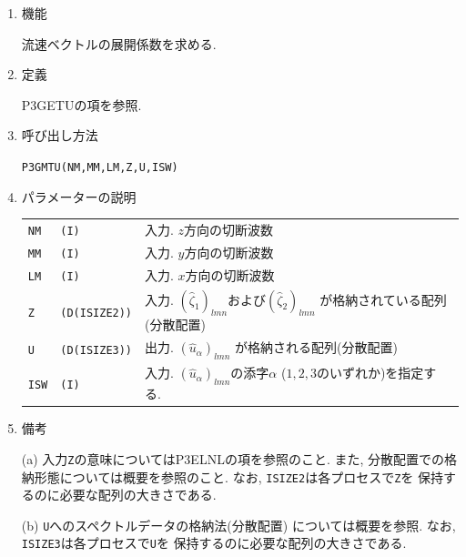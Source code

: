 \documentclass[a4j,fleqn]{jarticle}
\begin{document}
\begin{enumerate}

\item 機能

流速ベクトルの展開係数を求める.

\item 定義

P3GETUの項を参照.

\item 呼び出し方法

{\tt P3GMTU(NM,MM,LM,Z,U,ISW)}
  
\item パラメーターの説明

\begin{tabular}{lll}
{\tt NM} & {\tt (I)} & 入力. $z$方向の切断波数\\
{\tt MM} & {\tt (I)} & 入力. $y$方向の切断波数\\
{\tt LM} & {\tt (I)} & 入力. $x$方向の切断波数\\
{\tt Z} & {\tt (D(ISIZE2))} &
 入力. $(\hat{\zeta}_1)_{lmn}$および$(\hat{\zeta}_2)_{lmn}$
  が格納されている配列(分散配置)\\
{\tt U} & {\tt (D(ISIZE3))} &
 出力. $(\hat{u}_{\alpha})_{lmn}$
  が格納される配列(分散配置)\\
{\tt ISW} & {\tt (I)} & 入力. $(\hat{u}_{\alpha})_{lmn}$の添字$\alpha$
($1,2,3$のいずれか)を指定する.
\end{tabular}

\item 備考

(a) 入力{\tt Z}の意味についてはP3ELNLの項を参照のこと.
    また, 分散配置での格納形態については概要を参照のこと.
    なお, {\tt ISIZE2}は各プロセスで{\tt Z}を
    保持するのに必要な配列の大きさである.

(b) {\tt U}へのスペクトルデータの格納法(分散配置)
     については概要を参照.
    なお, {\tt ISIZE3}は各プロセスで{\tt U}を
    保持するのに必要な配列の大きさである.


\end{enumerate}
\end{document}

